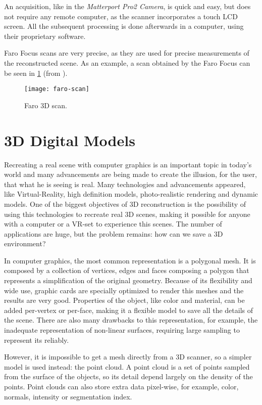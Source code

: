 An acquisition, like in the \emph{Matterport Pro2 Camera}, is quick and easy, but does not require any remote computer, as the scanner incorporates a touch LCD screen. All the subsequent processing is done afterwards in a computer, using their proprietary software.

Faro Focus scans are very precise, as they are used for precise measurements of the reconstructed scene. As an example, a scan obtained by the Faro Focus can be seen in \cref{fig:faro-scan} (from \cite{faro-scan}).

\begin{figure}[h]
    \centering
    \texttt{[image: faro-scan]}
    \caption{Faro 3D scan.}
    \label{fig:faro-scan}
    
\end{figure}

\section{3D Digital Models}

Recreating a real scene with computer graphics is an important topic in today's world and many advancements are being made to create the illusion, for the user, that what he is seeing is real. Many technologies and advancements appeared, like Virtual-Reality, high definition models, photo-realistic rendering and dynamic models. One of the biggest objectives of 3D reconstruction is the possibility of using this technologies to recreate real 3D scenes, making it possible for anyone with a computer or a VR-set to experience this scenes. The number of applications are huge, but the problem remains: how can we save a 3D environment?

In computer graphics, the most common representation is a polygonal mesh. It is composed by a collection of vertices, edges and faces composing a polygon that represents a simplification of the original geometry. Because of its flexibility and wide use, graphic cards are specially optimized to render this meshes and the results are very good. Properties of the object, like color and material, can be added per-vertex or per-face, making it a flexible model to save all the details of the scene. There are also many drawbacks to this representation, for example, the inadequate representation of non-linear surfaces, requiring large sampling to represent its reliably.

However, it is impossible to get a mesh directly from a 3D scanner, so a simpler model is used instead: the point cloud. A point cloud is a set of points sampled from the surface of the objects, so its detail depend largely on the density of the points. Point clouds can also store extra data pixel-wise, for example, color, normals, intensity or segmentation index.

